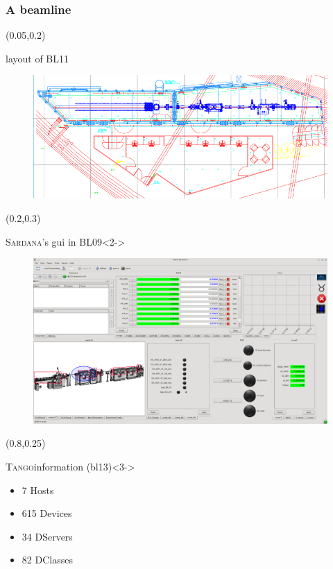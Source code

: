\documentclass{beamer}
\newcommand{\tango}{\textsc{Tango}}
\newcommand{\sardana}{\textsc{Sardana}}
\begin{document}
\begin{frame}
\frametitle{A beamline}
    \begin{textblock*}{100mm}(0.05\textwidth,0.2\textheight)
        \begin{block}{layout of BL11}
            \begin{figure}
                \includegraphics[width=\textwidth]{imgs/2009_bl11_ncd.png}
            \end{figure}
        \end{block}
    \end{textblock*}
    \begin{textblock*}{100mm}(0.2\textwidth,0.3\textheight)
        \begin{block}{\sardana's gui in BL09}<2->
            \begin{figure}
                \includegraphics[width=\textwidth]{imgs/20130917_ctbl09.png}
            \end{figure}
        \end{block}
    \end{textblock*}
    \begin{textblock*}{35mm}(0.8\textwidth,0.25\textheight)
        \begin{exampleblock}{\tango information (bl13)}<3->
            \begin{itemize}
                \item 7 Hosts
                \item 615 Devices
                \item 34 DServers
                \item 82 DClasses
            \end{itemize}
        \end{exampleblock}
    \end{textblock*}
\end{frame}
\end{document}
